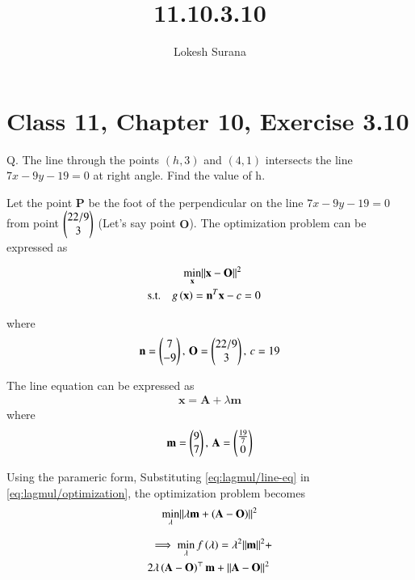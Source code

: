 \documentclass[journal,12pt,twocolumn]{IEEEtran}
\renewcommand{\vec}[1]{\boldsymbol{\mathbf{#1}}}
\begin{document}
\vspace{3cm}
\title{11.10.3.10}
\author{Lokesh Surana}
\maketitle
\section*{Class 11, Chapter 10, Exercise 3.10}

Q. The line through the points $(h, 3)$ and $(4, 1)$ intersects the line $7{x} - 9{y} - 19 = 0$ at right angle. Find the value of h.

\solution Let the point $\vec{P}$ be the foot of the perpendicular on the line $7{x} - 9{y} - 19 = 0$ from point $\begin{pmatrix}22/9\\3\end{pmatrix}$ (Let's say point $\vec{O}$).
The optimization problem can be expressed as

\begin{align}
    \label{eq:lagmul/optimization}
    \min_{\vec{x}} \norm{\vec{x}-\vec{O}}^2\\
    \label{eq:lagmul/eq1}
    \text{s.t.} \quad g\brak{\vec{x}} = \vec{n}^T\vec{x}-c &= 0 
\end{align}

where
\begin{align}
    \vec{n} = \myvec{7 \\ -9},\, \vec{O} = \myvec{22/9\\3}, \, c = 19
\end{align}

The line equation can be expressed as
\begin{align}
    \label{eq:lagmul/line-eq}
    \vec{x} = \vec{A}+\lambda\vec{m}
\end{align}
where
\begin{align}
    \vec{m} = \myvec{9            \\ 7},\,
    \vec{A} = \myvec{\frac{19}{7} \\ 0}
\end{align}

Using the parameric form, Substituting \eqref{eq:lagmul/line-eq} in \eqref{eq:lagmul/optimization}, the optimization problem becomes
\begin{align}
    \min_{\lambda} \norm{ \lambda\vec{m} +\brak{\vec{A}-\vec{O}}}^2
\end{align}

\begin{align}
    \begin{split}
        \ \implies \min_{\lambda}f\brak{\lambda} = \lambda^2\norm{\vec{m}}^2 + \\ 2\lambda\brak{\vec{A}-\vec{O}}^\top\vec{m} + \norm{\vec{A}-\vec{O}}^2 \
    \end{split}
\end{align}
\end{document}
